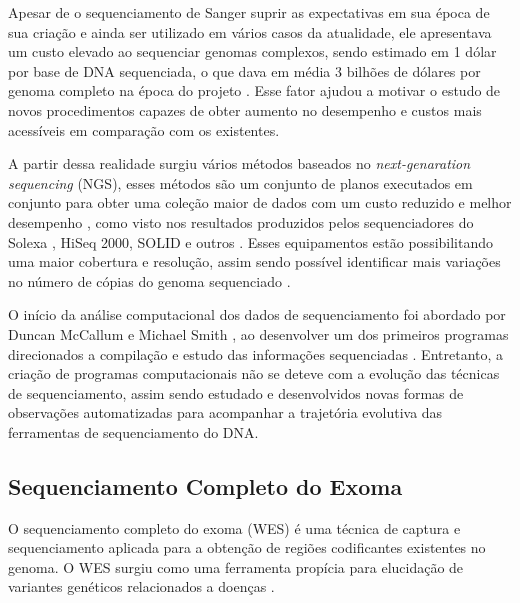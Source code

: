 Apesar de o sequenciamento de Sanger suprir as expectativas em sua época de sua criação e ainda ser utilizado em vários casos da atualidade, ele apresentava um custo elevado ao sequenciar genomas complexos, sendo estimado em 1 dólar por base de DNA sequenciada, o que dava em média 3 bilhões de dólares por genoma completo na época do projeto \cite{HutchisonIII2007}. Esse fator ajudou a motivar o estudo de novos procedimentos capazes de obter aumento no desempenho e custos mais acessíveis em comparação com os existentes.

A partir dessa realidade surgiu vários métodos baseados no \textit{next-genaration sequencing} (NGS), esses métodos são um conjunto de planos executados em conjunto para obter uma coleção maior de dados com um custo reduzido e melhor desempenho \cite{Metzker2010,Zhao2013}, como visto nos resultados produzidos pelos sequenciadores do Solexa \cite{Bennett2004}, HiSeq 2000, SOLID e outros \cite{Edwards2011,Linnarsson2010}. Esses equipamentos estão possibilitando uma maior cobertura e resolução, assim sendo possível identificar mais variações no número de cópias do genoma sequenciado \cite{Zhao2013}.


O início da análise computacional dos dados de sequenciamento foi abordado por Duncan McCallum e Michael Smith \cite{McCallum1977}, ao desenvolver um dos primeiros programas direcionados a compilação e estudo das informações sequenciadas \cite{HutchisonIII2007}. Entretanto, a criação de programas computacionais não se deteve com a evolução das técnicas de sequenciamento, assim sendo estudado e desenvolvidos novas formas de observações automatizadas para acompanhar a trajetória evolutiva das ferramentas de sequenciamento do DNA.


\subsection{Sequenciamento Completo do Exoma}

O sequenciamento completo do exoma (WES) é uma técnica de captura e sequenciamento aplicada para a obtenção de regiões codificantes existentes no genoma. O WES surgiu como uma ferramenta propícia para elucidação de variantes genéticos relacionados a doenças \cite{Goh2013}.


